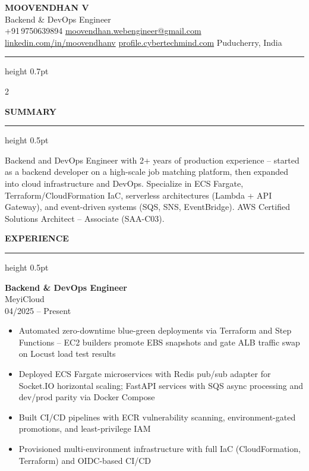 \documentclass[8.8pt,a4paper]{article}
\newcommand{\ressection}[1]{%
  \vspace{2pt}%
  {\fontsize{7.8}{9}\selectfont\bfseries\color{darkgray}\MakeUppercase{#1}}%
  \vspace{1pt}\hrule height 0.5pt\vspace{2pt}%
}
\newcommand{\jobentry}[3]{%
  {\fontsize{8.5}{10}\selectfont\bfseries\color{darkgray}#1}\\[0.2pt]%
  {\fontsize{7.8}{9}\selectfont\color{teal}#2}\\[0.2pt]%
  {\fontsize{6.8}{8}\selectfont\color{medgray}#3}%
  \vspace{0.8pt}%
}
\newcommand{\bi}[1]{{\fontsize{7.2}{9.5}\selectfont #1}}
\begin{document}
{\fontsize{21}{25}\selectfont\bfseries\color{darkgray}MOOVENDHAN V}\\[1.5pt]
{\fontsize{10}{12}\selectfont\color{teal}Backend \& DevOps Engineer}\\[3pt]
{\fontsize{7.3}{9}\selectfont\color{darkgray}
  +91\,9750639894\enspace
  \href{mailto:moovendhan.webengineer@gmail.com}{moovendhan.webengineer@gmail.com}\enspace
  \href{https://linkedin.com/in/moovendhanv}{linkedin.com/in/moovendhanv}\enspace
  \href{https://profile.cybertechmind.com}{profile.cybertechmind.com}\enspace
  Puducherry, India
}

\vspace{3pt}\hrule height 0.7pt\vspace{2pt}

\begin{paracol}{2}


\ressection{Summary}
{\fontsize{7.3}{9.8}\selectfont
Backend and DevOps Engineer with 2+ years of production experience -- started as a backend developer on a high-scale job matching platform, then expanded into cloud infrastructure and DevOps. Specialize in ECS Fargate, Terraform/CloudFormation IaC, serverless architectures (Lambda + API Gateway), and event-driven systems (SQS, SNS, EventBridge). AWS Certified Solutions Architect -- Associate (SAA-C03).
}

\vspace{1pt}
\ressection{Experience}

\jobentry{Backend \& DevOps Engineer}{MeyiCloud}{04/2025 -- Present}
\begin{itemize}
\item\bi{Automated zero-downtime blue-green deployments via Terraform and Step Functions -- EC2 builders promote EBS snapshots and gate ALB traffic swap on Locust load test results}
\item\bi{Deployed ECS Fargate microservices with Redis pub/sub adapter for Socket.IO horizontal scaling; FastAPI services with SQS async processing and dev/prod parity via Docker Compose}
\item\bi{Built CI/CD pipelines with ECR vulnerability scanning, environment-gated promotions, and least-privilege IAM}
\item\bi{Provisioned multi-environment infrastructure with full IaC (CloudFormation, Terraform) and OIDC-based CI/CD}
\end{itemize}


\end{paracol}
\end{document}
